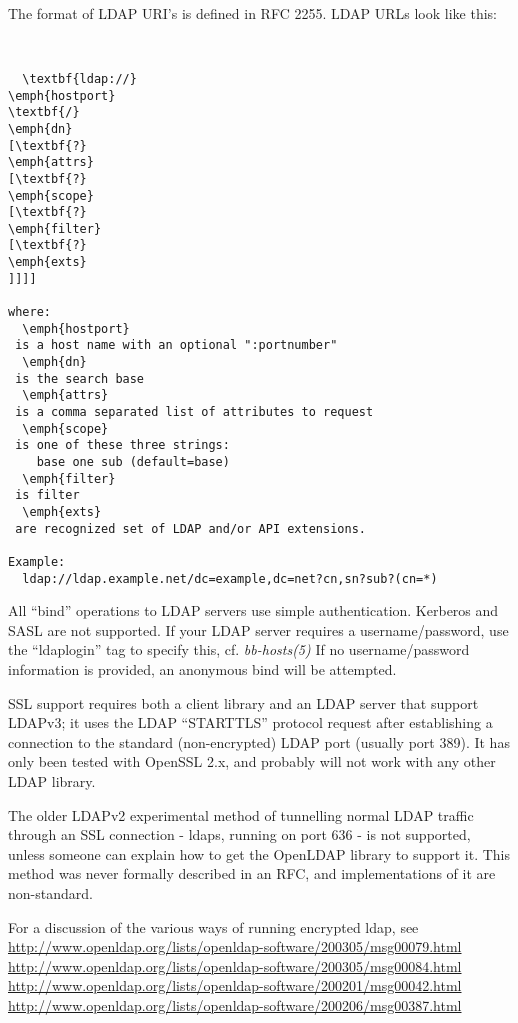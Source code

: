   The format of LDAP URI's is defined in RFC 2255. LDAP URLs look like this: \begin{verbatim}


  \textbf{ldap://}
\emph{hostport}
\textbf{/}
\emph{dn}
[\textbf{?}
\emph{attrs}
[\textbf{?}
\emph{scope}
[\textbf{?}
\emph{filter}
[\textbf{?}
\emph{exts}
]]]]

where:
  \emph{hostport}
 is a host name with an optional ":portnumber"
  \emph{dn}
 is the search base
  \emph{attrs}
 is a comma separated list of attributes to request
  \emph{scope}
 is one of these three strings:
    base one sub (default=base)
  \emph{filter}
 is filter
  \emph{exts}
 are recognized set of LDAP and/or API extensions.

Example:
  ldap://ldap.example.net/dc=example,dc=net?cn,sn?sub?(cn=*)

\end{verbatim}



  All ``bind'' operations to LDAP servers use simple
  authentication. Kerberos and SASL are not supported. If your LDAP
  server requires a username/password, use the ``ldaplogin'' tag to
  specify this, cf. \emph{bb-hosts(5) } If no username/password
  information is provided, an anonymous bind will be attempted. 



  SSL support requires both a client library and an LDAP server that
  support LDAPv3; it uses the LDAP ``STARTTLS'' protocol request after
  establishing a connection to the standard (non-encrypted) LDAP port
  (usually port 389). It has only been tested with OpenSSL 2.x, and
  probably will not work with any other LDAP library. 



  The older LDAPv2 experimental method of tunnelling normal LDAP
  traffic through an SSL connection - ldaps, running on port 636 - is
  not supported, unless someone can explain how to get the OpenLDAP
  library to support it. This method was never formally described in
  an RFC, and implementations of it are non-standard. 



  For a discussion of the various ways of running encrypted ldap, see  
\url{http://www.openldap.org/lists/openldap-software/200305/msg00079.html} 
\url{http://www.openldap.org/lists/openldap-software/200305/msg00084.html} 
\url{http://www.openldap.org/lists/openldap-software/200201/msg00042.html} 
\url{http://www.openldap.org/lists/openldap-software/200206/msg00387.html}


